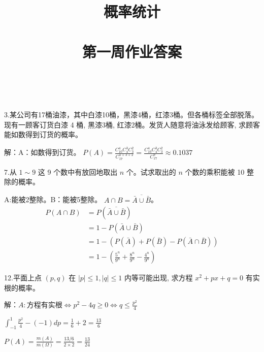 \documentclass[14pt]{scrartcl} %
\title{	
	\normalfont \huge
	\textsc{概率统计} \\ [25pt] %
	\horrule{0.5pt} \\[0.4cm] %
	\huge 第一周作业答案 \\ %
	\horrule{0.5pt} \\[0.4cm] %
	\date{}
}
\numberwithin{equation}{section} %
\numberwithin{figure}{section} %
\numberwithin{table}{section} %
\begin{document}
	\maketitle %
	3.某公司有17桶油漆，其中白漆10桶，黑漆4桶，红漆3桶。但各桶标签全部脱落。现有一顾客订货白漆 4 桶, 黑漆3桶, 红漆2桶。发货人随意将油泳发给顾客, 求顾客能如数得到订货的概率。
	
	\vspace*{1cm}
	解：A：如数得到订货。
	$P(A) = \frac{C_{10}^4 C_{4}^3 C_{3}^2}{C_{17}^{4 + 3 + 2}} = \frac{C_{10}^4 C_{4}^3 C_{3}^2}{C_{17}^9} \approx 0.1037$
	
	\vspace*{1cm}
	7.从 $1 \sim 9$ 这 9 个数中有放回地取出 $n$ 个。试求取出的 $n$ 个数的乘积能被 10 整除的概率。
	
	\vspace*{1cm}
	A:能被2整除。B：能被5整除。
	$A \cap B = \overline{\bar{A} \cup \bar{B}}$。
	\begin{align}
		P(A \cap B) & = P(\overline{\bar{A} \cup \bar{B}}) \\
		& =  1 - P(\bar{A} \cup \bar{B}) \\
		& =  1 - (P(\bar{A}) + P(\bar{B}) - P(\bar{A} \cap \bar{B})) \\
		& = 1 - (\frac{5 ^ n}{9 ^ n} + \frac{8 ^ n}{9 ^ n} - \frac{4 ^ n}{9 ^ n})
	\end{align}
	
	\vspace*{1cm}
	12.平面上点 $(p, q)$ 在 $|p| \leqslant 1,|q| \leqslant 1$ 内等可能出现, 求方程 $x^{2}+p x+q=0$ 有实根的概率。
	
	\vspace*{1cm}
	解：$A:\text{方程有实根} \Leftrightarrow p ^ 2 - 4 q \geq 0 \Leftrightarrow q \leq \frac{p ^ 2}{4}$
	
	$\int_{-1}^{1}\frac{p ^ 2}{4} - (-1) dp = \frac{1}{6} + 2 = \frac{13}{6}$
	
	$P(A) = \frac{m(A)}{m(\Omega)} = \frac{13/6}{2 \times 2} = \frac{13}{24}$
\end{document}
